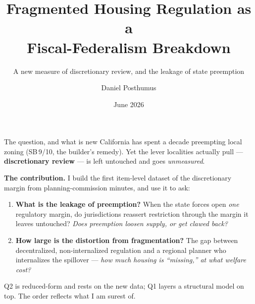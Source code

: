 \documentclass[10pt,aspectratio=169]{beamer}
\title{Fragmented Housing Regulation as a\\ Fiscal-Federalism Breakdown}
\subtitle{A new measure of discretionary review, and the leakage of state preemption}
\author{Daniel Posthumus}
\date{June 2026}
\begin{document}
\maketitle

\begin{frame}{The question, and what is new}
California has spent a decade preempting local zoning (SB\,9/10, the builder's remedy). Yet
the lever localities actually pull --- \textbf{discretionary review} --- is left untouched and
goes \emph{unmeasured}.

\bigskip
\textbf{The contribution.} I build the first item-level dataset of the discretionary margin from
planning-commission minutes, and use it to ask:
\begin{enumerate}
  \item[\textcolor{LayerR}{Q2}] \textbf{What is the leakage of preemption?} When the state forces
  open \emph{one} regulatory margin, do jurisdictions reassert restriction through the margin it
  leaves untouched? \emph{Does preemption loosen supply, or get clawed back?}
  \item[\textcolor{LayerR}{Q1}] \textbf{How large is the distortion from fragmentation?} The gap
  between decentralized, non-internalized regulation and a regional planner who internalizes the
  spillover --- \emph{how much housing is ``missing,'' at what welfare cost?}
\end{enumerate}

\medskip
\footnotesize Q2 is reduced-form and rests on the new data; Q1 layers a structural model on top.
The order reflects what I am surest of.
\end{frame}
\end{document}
